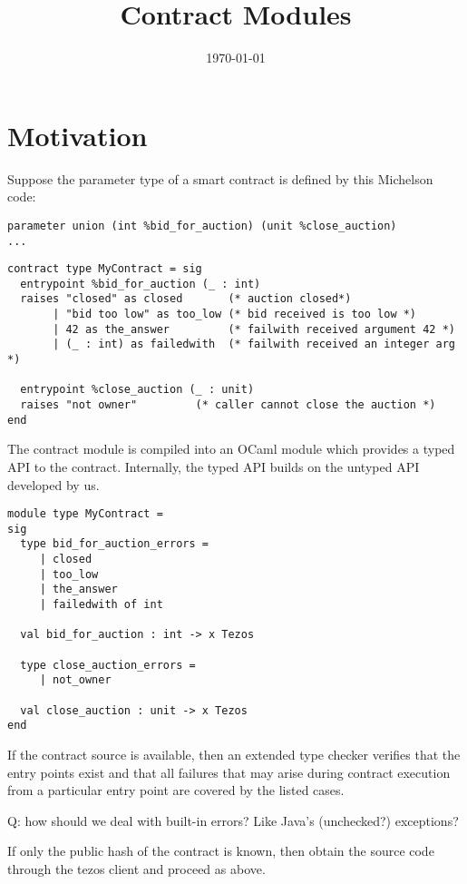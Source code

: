 \documentclass[a4paper]{llncs}
\title{Contract Modules}
\author{}
\institute{}
\date{\today}
\begin{document}
\maketitle
\pagestyle{plain}

\section{Motivation}
\label{sec:motivation}


Suppose the parameter type of a smart contract is defined by this Michelson code:
\begin{verbatim}
parameter union (int %bid_for_auction) (unit %close_auction)
...
\end{verbatim}


\begin{lstlisting}[language=caml]
contract type MyContract = sig
  entrypoint %bid_for_auction (_ : int) 
  raises "closed" as closed       (* auction closed*)
       | "bid too low" as too_low (* bid received is too low *)
       | 42 as the_answer         (* failwith received argument 42 *)
       | (_ : int) as failedwith  (* failwith received an integer arg *)

  entrypoint %close_auction (_ : unit)
  raises "not owner"         (* caller cannot close the auction *)
end
\end{lstlisting}

The contract module is compiled into an OCaml module which provides a typed API to the
contract. Internally, the typed API builds on the untyped API developed by us.

\begin{lstlisting}[language=caml]
module type MyContract =
sig 
  type bid_for_auction_errors = 
     | closed 
     | too_low 
     | the_answer
     | failedwith of int

  val bid_for_auction : int -> x Tezos

  type close_auction_errors = 
     | not_owner

  val close_auction : unit -> x Tezos
end
\end{lstlisting}

If the contract source is available, then an extended type checker verifies that the entry points
exist and that all failures that may arise during contract execution from a particular entry point
are covered by the listed cases.

Q: how should we deal with built-in errors? Like Java's (unchecked?) exceptions?

If only the public hash of the contract is known, then obtain the source code through the tezos
client and proceed as above.
\end{document}
